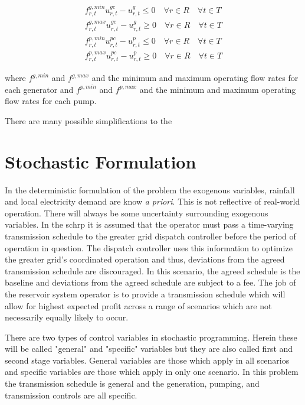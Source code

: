 \documentclass[12pt]{article}
\begin{document}
\begin{gather}
	f_{r,t}^{g,min}u_{r,t}^{gc}-u_{r,t}^{g}\leq 0 \quad\forall r \in R \quad\forall t \in T\\
	f_{r,t}^{g,max}u_{r,t}^{gc}-u_{r,t}^{g}\geq 0 \quad\forall r \in R \quad\forall t \in T\\
	f_{r,t}^{p,min}u_{r,t}^{pc}-u_{r,t}^{p}\leq 0 \quad\forall r \in R \quad\forall t \in T\\
	f_{r,t}^{p,max}u_{r,t}^{pc}-u_{r,t}^{p}\geq 0 \quad\forall r \in R \quad\forall t \in T
\end{gather}

where $f^{g,min}$ and $f^{g,max}$ and the minimum and maximum operating flow rates for each generator and $f^{p,min}$ and $f^{p,max}$ and the minimum and maximum operating flow rates for each pump.

There are many possible simplifications to the 

\section*{Stochastic Formulation}

In the deterministic formulation of the problem the exogenous variables, rainfall and local electricity demand are know \textit{a priori}. This is not reflective of real-world operation. There will always be some uncertainty surrounding exogenous variables. In the \gls{schrp} it is assumed that the operator must pass a time-varying transmission schedule to the greater grid dispatch controller before the period of operation in question. The dispatch controller uses this information to optimize the greater grid's coordinated operation and thus, deviations from the agreed transmission schedule are discouraged. In this scenario, the agreed schedule is the baseline and deviations from the agreed schedule are subject to a fee. The job of the reservoir system operator is to provide a transmission schedule which will allow for highest expected profit across a range of scenarios which are not necessarily equally likely to occur.

There are two types of control variables in stochastic programming. Herein these will be called "general" and "specific" variables but they are also called first and second stage variables. General variables are those which apply in all scenarios and specific variables are those which apply in only one scenario. In this problem the transmission schedule is general and the generation, pumping, and transmission controls are all specific.
\end{document}
